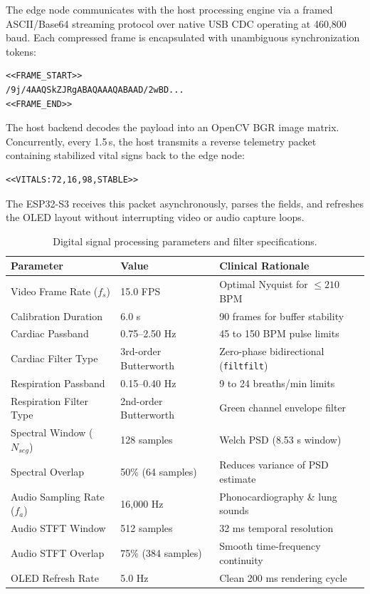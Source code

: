 \documentclass[journal]{IEEEtran}
\begin{document}
The edge node communicates with the host processing engine via a framed ASCII/Base64 streaming protocol over native USB CDC operating at 460,800\,baud. Each compressed frame is encapsulated with unambiguous synchronization tokens:
\begin{verbatim}
<<FRAME_START>>
/9j/4AAQSkZJRgABAQAAAQABAAD/2wBD...
<<FRAME_END>>
\end{verbatim}

The host backend decodes the payload into an OpenCV BGR image matrix. Concurrently, every 1.5\,s, the host transmits a reverse telemetry packet containing stabilized vital signs back to the edge node:
\begin{verbatim}
<<VITALS:72,16,98,STABLE>>
\end{verbatim}
The ESP32-S3 receives this packet asynchronously, parses the fields, and refreshes the OLED layout without interrupting video or audio capture loops.

\begin{table}[!t]
    \centering
    \caption{Digital signal processing parameters and filter specifications.}
    \label{tab:dsp_parameters}
    \footnotesize
    \renewcommand{\arraystretch}{1.08}
    \setlength{\tabcolsep}{2.2pt}
    \begin{tabular}{p{2.6cm} p{1.7cm} p{3.7cm}}
        \toprule
        \textbf{Parameter} & \textbf{Value} & \textbf{Clinical Rationale} \\
        \midrule
        Video Frame Rate ($f_s$) & 15.0 FPS & Optimal Nyquist for $\le 210$\,BPM \\
        Calibration Duration & 6.0 s & 90 frames for buffer stability \\
        Cardiac Passband & 0.75--2.50 Hz & 45 to 150 BPM pulse limits \\
        Cardiac Filter Type & 3rd-order Butterworth & Zero-phase bidirectional (\texttt{filtfilt}) \\
        Respiration Passband & 0.15--0.40 Hz & 9 to 24 breaths/min limits \\
        Respiration Filter Type & 2nd-order Butterworth & Green channel envelope filter \\
        Spectral Window ($N_{seg}$) & 128 samples & Welch PSD (8.53 s window) \\
        Spectral Overlap & 50\% (64 samples) & Reduces variance of PSD estimate \\
        Audio Sampling Rate ($f_a$) & 16,000 Hz & Phonocardiography \& lung sounds \\
        Audio STFT Window & 512 samples & 32 ms temporal resolution \\
        Audio STFT Overlap & 75\% (384 samples) & Smooth time-frequency continuity \\
        OLED Refresh Rate & 5.0 Hz & Clean 200 ms rendering cycle \\
        \bottomrule
    \end{tabular}
\end{table}
\end{document}
